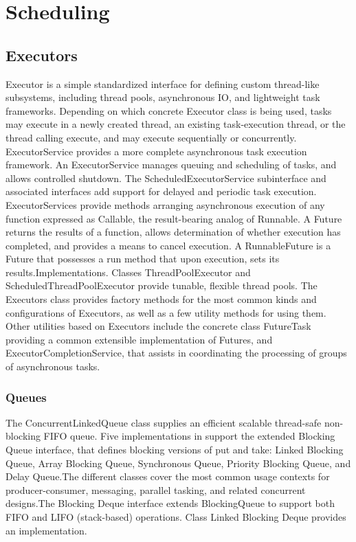
\chapter{Scheduling}

\section{Executors}

Executor is a simple standardized interface for defining custom thread-like subsystems, including thread pools, asynchronous IO, and lightweight task frameworks. Depending on which concrete Executor class is being used, tasks may execute in a newly created thread, an existing task-execution thread, or the thread calling execute, and may execute sequentially or concurrently. ExecutorService provides a more complete asynchronous task execution framework. An ExecutorService manages queuing and scheduling of tasks, and allows controlled shutdown. The ScheduledExecutorService subinterface and associated interfaces add support for delayed and periodic task execution. ExecutorServices provide methods arranging asynchronous execution of any function expressed as Callable, the result-bearing analog of Runnable. A Future returns the results of a function, allows determination of whether execution has completed, and provides a means to cancel execution. A RunnableFuture is a Future that possesses a run method that upon execution, sets its results.Implementations. Classes ThreadPoolExecutor and ScheduledThreadPoolExecutor provide tunable, flexible thread pools. The Executors class provides factory methods for the most common kinds and configurations of Executors, as well as a few utility methods for using them. Other utilities based on Executors include the concrete class FutureTask providing a common extensible implementation of Futures, and ExecutorCompletionService, that assists in coordinating the processing of groups of asynchronous tasks.


\subsection{Queues}
The ConcurrentLinkedQueue class supplies an efficient scalable thread-safe non-blocking FIFO queue.
Five implementations in  support the extended Blocking Queue interface, that defines blocking versions of put and take: Linked Blocking Queue, Array Blocking Queue, Synchronous Queue, Priority Blocking Queue, and Delay Queue.The different classes cover the most common usage contexts for producer-consumer, messaging, parallel tasking, and related concurrent designs.The Blocking Deque interface extends BlockingQueue to support both FIFO and LIFO (stack-based) operations. Class Linked Blocking Deque provides an implementation.


